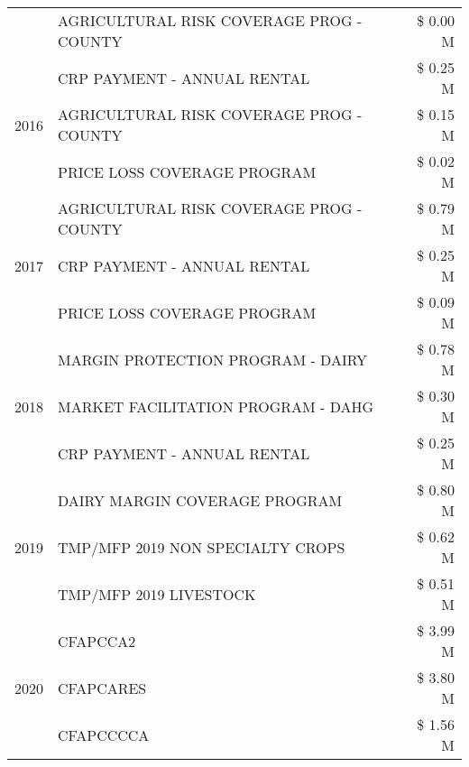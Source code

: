 \begin{tabular}{llr}
 & AGRICULTURAL RISK COVERAGE PROG - COUNTY & \$ 0.00 M \\
\cline{1-3}
\multirow[t]{3}{*}{2016} & CRP PAYMENT - ANNUAL RENTAL & \$ 0.25 M \\
 & AGRICULTURAL RISK COVERAGE PROG - COUNTY & \$ 0.15 M \\
 & PRICE LOSS COVERAGE PROGRAM & \$ 0.02 M \\
\cline{1-3}
\multirow[t]{3}{*}{2017} & AGRICULTURAL RISK COVERAGE PROG - COUNTY & \$ 0.79 M \\
 & CRP PAYMENT - ANNUAL RENTAL & \$ 0.25 M \\
 & PRICE LOSS COVERAGE PROGRAM & \$ 0.09 M \\
\cline{1-3}
\multirow[t]{3}{*}{2018} & MARGIN PROTECTION PROGRAM - DAIRY & \$ 0.78 M \\
 & MARKET FACILITATION PROGRAM - DAHG & \$ 0.30 M \\
 & CRP PAYMENT - ANNUAL RENTAL & \$ 0.25 M \\
\cline{1-3}
\multirow[t]{3}{*}{2019} & DAIRY MARGIN COVERAGE PROGRAM & \$ 0.80 M \\
 & TMP/MFP 2019 NON SPECIALTY CROPS & \$ 0.62 M \\
 & TMP/MFP 2019 LIVESTOCK & \$ 0.51 M \\
\cline{1-3}
\multirow[t]{3}{*}{2020} & CFAPCCA2 & \$ 3.99 M \\
 & CFAPCARES & \$ 3.80 M \\
 & CFAPCCCCA & \$ 1.56 M \\
\cline{1-3}
\bottomrule
\end{tabular}
